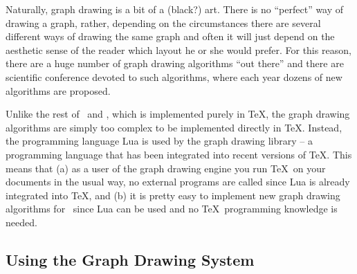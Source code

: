 Naturally, graph drawing is a bit of a (black?) art. There is no
``perfect'' way of drawing a graph, rather, depending on the
circumstances there are several different ways of drawing the same
graph and often it will just depend on the aesthetic sense of the
reader which layout he or she would prefer. For this reason, there are
a huge number of graph drawing algorithms ``out there'' and there are
scientific conference devoted to such algorithms, where each
year dozens of new algorithms are proposed.

Unlike the rest of \pgfname\ and \tikzname, which is implemented
purely in \TeX, the graph drawing algorithms are simply too complex to
be implemented directly in \TeX. Instead, the programming language Lua is used
by the graph drawing library -- a programming language that has been
integrated into recent versions of \TeX. This means that (a) as a user
of the graph drawing engine you run \TeX\ on your documents
in the usual way, no external programs are called since Lua is already
integrated into \TeX, and (b) it is pretty easy to implement new graph
drawing algorithms for \tikzname\ since Lua can be used and no \TeX\
programming knowledge is needed. 


\subsection{Using the Graph Drawing System}


